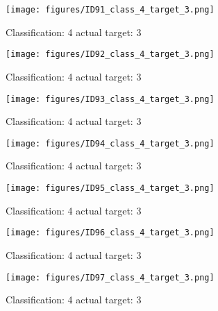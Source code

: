 \begin{figure}[h!]
\begin{center}
\texttt{[image: figures/ID91\_class\_4\_target\_3.png]}
\end{center}
\caption{ Classification: 4 actual target: 3}
\label{fig:ID91_class_4_target_3}
\end{figure}
\begin{figure}[h!]
\begin{center}
\texttt{[image: figures/ID92\_class\_4\_target\_3.png]}
\end{center}
\caption{ Classification: 4 actual target: 3}
\label{fig:ID92_class_4_target_3}
\end{figure}
\begin{figure}[h!]
\begin{center}
\texttt{[image: figures/ID93\_class\_4\_target\_3.png]}
\end{center}
\caption{ Classification: 4 actual target: 3}
\label{fig:ID93_class_4_target_3}
\end{figure}
\begin{figure}[h!]
\begin{center}
\texttt{[image: figures/ID94\_class\_4\_target\_3.png]}
\end{center}
\caption{ Classification: 4 actual target: 3}
\label{fig:ID94_class_4_target_3}
\end{figure}
\begin{figure}[h!]
\begin{center}
\texttt{[image: figures/ID95\_class\_4\_target\_3.png]}
\end{center}
\caption{ Classification: 4 actual target: 3}
\label{fig:ID95_class_4_target_3}
\end{figure}
\begin{figure}[h!]
\begin{center}
\texttt{[image: figures/ID96\_class\_4\_target\_3.png]}
\end{center}
\caption{ Classification: 4 actual target: 3}
\label{fig:ID96_class_4_target_3}
\end{figure}
\begin{figure}[h!]
\begin{center}
\texttt{[image: figures/ID97\_class\_4\_target\_3.png]}
\end{center}
\caption{ Classification: 4 actual target: 3}
\label{fig:ID97_class_4_target_3}
\end{figure}
